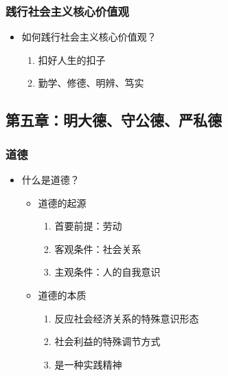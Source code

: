 \hypertarget{ux8df5ux884cux793eux4f1aux4e3bux4e49ux6838ux5fc3ux4ef7ux503cux89c2}{%
\subsubsection{践行社会主义核心价值观}\label{ux8df5ux884cux793eux4f1aux4e3bux4e49ux6838ux5fc3ux4ef7ux503cux89c2}}

\begin{itemize}
\tightlist
\item
  如何践行社会主义核心价值观？

  \begin{enumerate}
  \def\labelenumi{\arabic{enumi}.}
  \tightlist
  \item
    扣好人生的扣子
  \item
    勤学、修德、明辨、笃实
  \end{enumerate}
\end{itemize}

\hypertarget{ux7b2cux4e94ux7ae0ux660eux5927ux5fb7ux5b88ux516cux5fb7ux4e25ux79c1ux5fb7}{%
\subsection{第五章：明大德、守公德、严私德}\label{ux7b2cux4e94ux7ae0ux660eux5927ux5fb7ux5b88ux516cux5fb7ux4e25ux79c1ux5fb7}}

\hypertarget{ux9053ux5fb7}{%
\subsubsection{道德}\label{ux9053ux5fb7}}

\begin{itemize}
\tightlist
\item
  什么是道德？

  \begin{itemize}
  \tightlist
  \item
    道德的起源

    \begin{enumerate}
    \def\labelenumi{\arabic{enumi}.}
    \tightlist
    \item
      首要前提：劳动
    \item
      客观条件：社会关系
    \item
      主观条件：人的自我意识
    \end{enumerate}
  \item
    道德的本质

    \begin{enumerate}
    \def\labelenumi{\arabic{enumi}.}
    \tightlist
    \item
      反应社会经济关系的特殊意识形态
    \item
      社会利益的特殊调节方式
    \item
      是一种实践精神
    \end{enumerate}
  \end{itemize}
\end{itemize}

